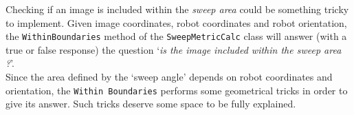 Checking if an image is included within the \textit{sweep area}
could be something tricky to implement. Given image coordinates, 
robot coordinates and robot orientation, the \texttt{WithinBoundaries} 
method of the \texttt{SweepMetricCalc} class 
will answer (with a true or false response) the question
`\textit{is the image included within the sweep area ?}'.
\\
Since the area defined by the `sweep angle' depends on robot 
coordinates and orientation, the \texttt{Within Boundaries}
performs some geometrical tricks in order to give its answer. 
Such tricks deserve some space to be fully explained.
\begin{figure}[htp]
  \begin{center}
    \hspace*{15pt}


\end{center}
\end{figure}
